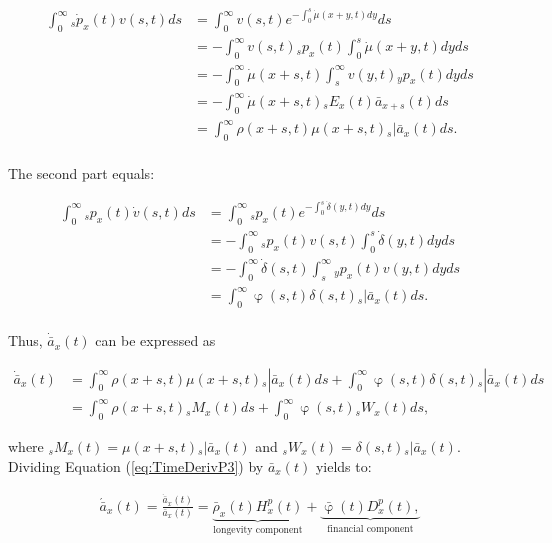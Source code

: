 \documentclass[12pt]{article}
\begin{document}
\begin{equation}\label{eq:TimeDerivP1}
\begin{split}
\int_0^\infty {}_s\dot{p}_x(t) v(s,t)ds &= \int_0^\infty   v(s,t) e^{-\int_0^{s}\dot{\mu}(x+y,t)dy}ds\\
&= -\int_0^\infty   v(s,t) {}_sp_x(t)\int_0^{s}\dot{\mu}(x+y,t)dyds\\
&= -\int_0^\infty  \dot{\mu}(x+s,t) \int_s^{\infty} v(y,t) {}_yp_x(t) dyds\\
&= - \int_0^\infty \dot{\mu}(x+s,t)   {}_sE_x(t) \bar{a} _{x+s}(t) ds\\
&= \int_0^\infty \rho(x+s,t) \mu(x+s,t)   {}_s|\bar{a}_x(t) ds.\\
\end{split}
\end{equation}


The second part equals:

\begin{equation}\label{eq:TimeDerivP2}
\begin{split}
\int_0^\infty {}_sp_x(t) \dot{v}(s,t)ds &= \int_0^\infty {}_sp_x(t)  e^{-\int_0^{s}\dot{\delta}(y,t)dy}ds\\
&= -\int_0^\infty {}_sp_x(t) v(s,t) \int_0^{s}\dot{\delta}(y,t)dy ds\\
&= -\int_0^\infty  \dot{\delta}(s,t)\int_s^{\infty} {}_yp_x(t) v(y,t) dy ds\\
&= \int_0^\infty  \upvarphi(s,t) \delta(s,t)  {}_s|\bar{a}_x(t) ds.\\
\end{split}
\end{equation}


Thus, $\dot{\bar{a}} _x(t)$ can be expressed as


\begin{equation}\label{eq:TimeDerivP3}
\begin{split}
\dot{\bar{a}}_{x}(t) &=  \int_0^\infty \rho(x+s,t) \mu(x+s,t){}_s|\bar{a}_x(t) ds +\int_0^\infty  \upvarphi(s,t) \delta(s,t)  {}_s|\bar{a}_x(t) ds\\
&= \int_0^\infty \rho(x+s,t) {}_sM_x(t)  ds +\int_0^\infty  \upvarphi(s,t) {}_sW_x(t)  ds,
\end{split}
\end{equation}


where ${}_sM_x(t)= \mu(x+s,t){}_s|\bar{a}_x(t)$ and ${}_sW_x(t)=\delta(s,t)  {}_s|\bar{a}_x(t)$. Dividing Equation (\ref{eq:TimeDerivP3}) by $\bar{a}_x(t)$ yields to:


\begin{equation}\label{eq:TimeDerivP}
\begin{split}
 \acute{\bar{a}}_x(t) = \frac{\dot{\bar{a}}_x(t)}{\bar{a}_x(t)}  = 
 \underbrace{\bar{\rho}_x(t){H}^{p}_x(t)}_\text{longevity component}
 +\underbrace{\bar{\upvarphi}(t){D}^{p}_x(t),}_\text{financial component}
\end{split}
\end{equation}
\end{document}
